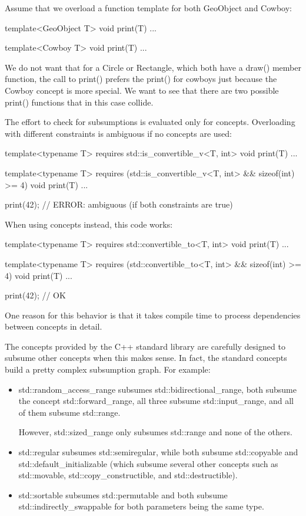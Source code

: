 Assume that we overload a function template for both GeoObject and Cowboy:

\begin{cpp}
template<GeoObject T>
void print(T) {
	...
}

template<Cowboy T>
void print(T) {
	...
}
\end{cpp}

We do not want that for a Circle or Rectangle, which both have a draw() member function, the call to print() prefers the print() for cowboys just because the Cowboy concept is more special. We want to see that there are two possible print() functions that in this case collide.

The effort to check for subsumptions is evaluated only for concepts. Overloading with different constraints is ambiguous if no concepts are used:

\begin{cpp}
template<typename T>
requires std::is_convertible_v<T, int>
void print(T) {
	...
}

template<typename T>
requires (std::is_convertible_v<T, int> && sizeof(int) >= 4)
void print(T) {
	...
}

print(42); // ERROR: ambiguous (if both constraints are true)
\end{cpp}

When using concepts instead, this code works:

\begin{cpp}
template<typename T>
requires std::convertible_to<T, int>
void print(T) {
	...
}

template<typename T>
requires (std::convertible_to<T, int> && sizeof(int) >= 4)
void print(T) {
	...
}

print(42); // OK
\end{cpp}

One reason for this behavior is that it takes compile time to process dependencies between concepts in detail.

The concepts provided by the C++ standard library are carefully designed to subsume other concepts when this makes sense. In fact, the standard concepts build a pretty complex subsumption graph. For example:

\begin{itemize}
\item
std::random\_access\_range subsumes std::bidirectional\_range, both subsume the concept std::forward\_range, all three subsume std::input\_range, and all of them subsume std::range.

However, std::sized\_range only subsumes std::range and none of the others.

\item
std::regular subsumes std::semiregular, while both subsume std::copyable and std::default\_initializable (which subsume several other concepts such as std::movable, std::copy\_constructible, and std::destructible).

\item
std::sortable subsumes std::permutable and both subsume std::indirectly\_swappable for both parameters being the same type.
\end{itemize}


